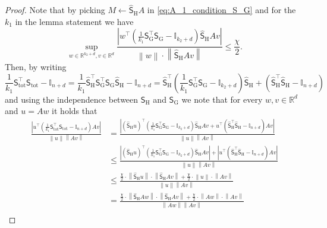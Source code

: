 \documentclass[11pt]{article}
\theoremstyle{definition}
\theoremstyle{plain}
\newcommand{\reals}{\mathbb{R}}
\providecommand{\brI}{\mathbb{I}}
\newcommand{\abs}[1]{\left| #1 \right|}
\newcommand{\Norm}[1]{\left\| #1 \right\|}
\providecommand{\norm}[1]{\Norm{#1}}
\begin{document}
\begin{proof}
Note that by picking $M \gets \widehat{\mathsf{S}}_{\mathrm{H}}A$ in \eqref{eq:A_1_condition_S_G} and for the $k_1$ in the lemma statement we have  
\begin{equation}
    \sup_{w \in \reals^{k_2 + d}, v \in \reals^{d}} \frac{\left|w^{\top}\left(\frac{1}{k_1}\mathsf{S}^{\top}_{\mathrm{G}}\mathsf{S}_{\mathrm{G}} - \brI_{k_2 + d}\right) \widehat{\mathsf{S}}_{\mathrm{H}}A v\right|}{\norm{w} \cdot \norm{\widehat{\mathsf{S}}_{\mathrm{H}}A v}} \leq \frac{\chi}{2}.
\end{equation}
Then, by writing 
\begin{equation}
    \label{eq:subspace_mebedding_S_G}
    \frac{1}{k_1}\mathsf{S}_{\mathrm{tot}}^{\top}\mathsf{S}_{\mathrm{tot}} - \brI_{n+d} = \frac{1}{k_1}\widehat{\mathsf{S}}_{\mathrm{H}}^{\top}\mathsf{S}^{\top}_{\mathrm{G}}\mathsf{S}_{\mathrm{G}}\widehat{\mathsf{S}}_{\mathrm{H}} - \brI_{n+d} = \widehat{\mathsf{S}}_{\mathrm{H}}^{\top}\left(\frac{1}{k_1}\mathsf{S}^{\top}_{\mathrm{G}}\mathsf{S}_{\mathrm{G}} - \brI_{k_2+d}\right)\widehat{\mathsf{S}}_{\mathrm{H}} + \left(\widehat{\mathsf{S}}_{\mathrm{H}}^{\top}\widehat{\mathsf{S}}_{\mathrm{H}} - \brI_{n+d}\right)
\end{equation}
and using the independence between $\mathsf{S}_{\mathrm{H}}$ and $\mathsf{S}_{\mathrm{G}}$ we note that for every $w,v \in \reals^{d}$ and $u = Aw$ it holds that
\begin{align}
    \frac{\abs{u^{\top}\left(\frac{1}{k_1}\mathsf{S}_{\mathrm{tot}}^{\top}\mathsf{S}_{\mathrm{tot}} - \brI_{n+d}\right)Av}}{\norm{u}\norm{Av}} &= \frac{\abs{\left(\widehat{\mathsf{S}}_{\mathrm{H}}u\right)^{\top}\left(\frac{1}{k_1}\mathsf{S}^{\top}_{\mathrm{G}}\mathsf{S}_{\mathrm{G}} - \brI_{k_2+d}\right)\widehat{\mathsf{S}}_{\mathrm{H}}Av + u^{\top}\left(\widehat{\mathsf{S}}_{\mathrm{H}}^{\top}\widehat{\mathsf{S}}_{\mathrm{H}} - \brI_{n+d}\right)Av}}{\norm{u}\norm{Av}}\\
    &\leq \frac{\abs{\left(\widehat{\mathsf{S}}_{\mathrm{H}}u\right)^{\top}\left(\frac{1}{k_1}\mathsf{S}^{\top}_{\mathrm{G}}\mathsf{S}_{\mathrm{G}} - \brI_{k_2+d}\right)\widehat{\mathsf{S}}_{\mathrm{H}}Av} + \abs{u^{\top}\left(\widehat{\mathsf{S}}_{\mathrm{H}}^{\top}\widehat{\mathsf{S}}_{\mathrm{H}} - \brI_{n+d}\right)Av}}{\norm{u}\norm{Av}}\\
    &\leq \frac{\frac{\chi}{2}\cdot \norm{\widehat{\mathsf{S}}_{\mathrm{H}}u}\cdot\norm{\widehat{\mathsf{S}}_{\mathrm{H}}Av} + \frac{\chi}{2}\cdot \norm{u}\cdot \norm{Av}}{\norm{u}\norm{Av}}\\
    &= \frac{\frac{\chi}{2}\cdot \norm{\widehat{\mathsf{S}}_{\mathrm{H}}Aw}\cdot\norm{\widehat{\mathsf{S}}_{\mathrm{H}}Av} + \frac{\chi}{2}\cdot \norm{Aw}\cdot \norm{Av}}{\norm{Aw}\norm{Av}} \\

\end{align}
\end{proof}
\end{document}
